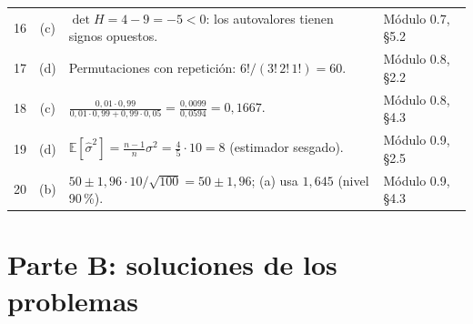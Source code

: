 \begin{table}[h]
\begin{tabularx}{\textwidth}{@{}c c >{\raggedright\arraybackslash}X l@{}}
16 & (c) & $\det H=4-9=-5<0$: los autovalores tienen signos opuestos. & Módulo 0.7, §5.2 \\
17 & (d) & Permutaciones con repetición: $6!/(3!\,2!\,1!)=60$. & Módulo 0.8, §2.2 \\
18 & (c) & $\frac{0{,}01\cdot0{,}99}{0{,}01\cdot0{,}99+0{,}99\cdot0{,}05}=\frac{0{,}0099}{0{,}0594}=0{,}1667$. & Módulo 0.8, §4.3 \\
19 & (d) & $\mathbb E[\widehat\sigma^{2}]=\frac{n-1}{n}\sigma^{2}=\frac45\cdot10=8$ (estimador sesgado). & Módulo 0.9, §2.5 \\
20 & (b) & $50\pm1{,}96\cdot10/\sqrt{100}=50\pm1{,}96$; (a) usa $1{,}645$ (nivel 90\,\%). & Módulo 0.9, §4.3 \\
\bottomrule
\end{tabularx}
\end{table}

\section{Parte B: soluciones de los problemas}

